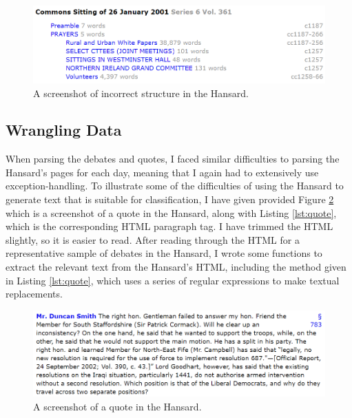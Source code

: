\documentclass[12pt,a4paper,twoside,openright]{report}
\newcommand{\mylisting}[4]{}
\newcommand{\pylisting}[2]{\mylisting{Python}{py}{#1}{#2}}
\newcommand{\htmllisting}[2]{\mylisting{HTML}{html}{#1}{#2}}
\begin{document}
\begin{figure}
	\includegraphics[width=\linewidth]{figs/incorrecthansard.png}
	\caption{A screenshot of incorrect structure in the Hansard.}
	\label{fig:incorrecthansard}
\end{figure}

\pylisting{High-level code used to scrape all the debates from a given day.}{add_day}

\subsection{Wrangling Data} \label{impl-wrangling}
When parsing the debates and quotes, I faced similar difficulties to parsing the Hansard's pages for each day, meaning that I again had to extensively use exception-handling. To illustrate some of the difficulties of using the Hansard to generate text that is suitable for classification, I have given provided Figure \ref{fig:hansardquote} which is a screenshot of a quote in the Hansard, along with Listing \ref{lst:quote}, which is the corresponding HTML paragraph tag. I have trimmed the HTML slightly, so it is easier to read. After reading through the HTML for a representative sample of debates in the Hansard, I wrote some functions to extract the relevant text from the Hansard's HTML, including the method given in Listing \ref{lst:quote}, which uses a series of regular expressions to make textual replacements.

\begin{figure}
	\includegraphics[width=\linewidth]{figs/idsquote.png}
	\caption{A screenshot of a quote in the Hansard.}
	\label{fig:hansardquote}
\end{figure}

\htmllisting{HTML paragraph tag of the quote in Figure \ref{fig:hansardquote}.}{quote}
\end{document}

